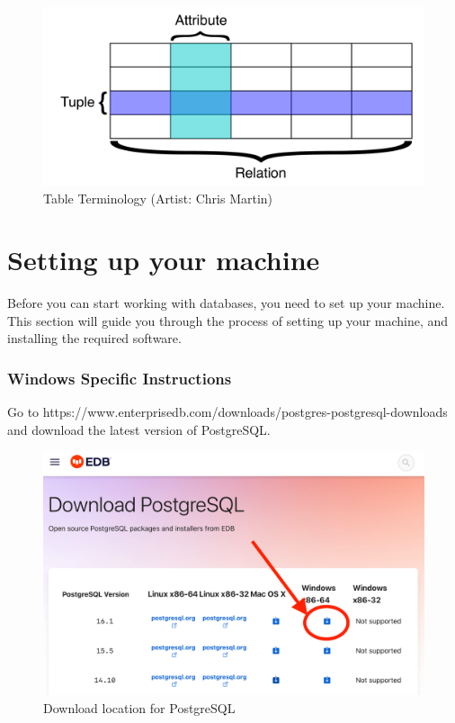 \begin{figure}[htbp]
    \centering
    \includegraphics[width=1\textwidth]{content/1-relational-databases/figures/2.table-definitions.png}
    \caption{Table Terminology (Artist: Chris Martin)}
    \label{fig:2.table-definitions.png}
\end{figure}

\section{Setting up your machine}
Before you can start working with databases, you need to set up your machine. This section will guide you through the process of setting up your machine, and installing the required software.

\subsubsection*{Windows Specific Instructions}
Go to https://www.enterprisedb.com/downloads/postgres-postgresql-downloads and download the latest version of PostgreSQL. 
\begin{figure}[htb]
    \centering
    \includegraphics[width=1\textwidth]{content/1-relational-databases/figures/1.install-for-windows-1.png}
    \caption{Download location for PostgreSQL}
    \label{fig:1.postgresql-download-1.png}
\end{figure}

